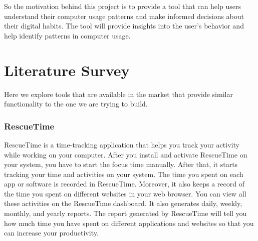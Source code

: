 \documentclass[openany]{report}
\begin{document}
So the motivation behind this project is to provide a tool that can help users understand their computer usage patterns and make informed decisions about their digital habits. The tool will provide insights into the user's behavior and help identify patterns in computer usage.

\chapter{Literature Survey}
Here we explore tools that are available in the market that provide similar functionality to the one we are trying to build.\\

\subsection{RescueTime}
RescueTime is a time-tracking application that helps you track your activity while working on your computer. After you install and activate RescueTime on your system, you have to start the focus time manually. After that, it starts tracking your time and activities on your system. The time you spent on each app or software is recorded in RescueTime. Moreover, it also keeps a record of the time you spent on different websites in your web browser. You can view all these activities on the RescueTime dashboard. It also generates daily, weekly, monthly, and yearly reports. The report generated by RescueTime will tell you how much time you have spent on different applications and websites so that you can increase your productivity.
\end{document}

